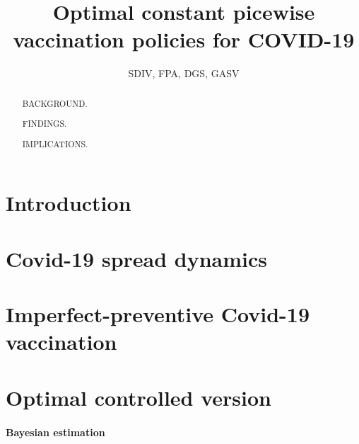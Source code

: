 \documentclass[a4paper,10pt, 5p]{elsarticle}
\begin{document}
    \author{SDIV, FPA, DGS, GASV}
    \title{Optimal constant picewise vaccination policies for COVID-19}
    \begin{abstract}
      
      BACKGROUND.

      FINDINGS.
      
      IMPLICATIONS.
    \end{abstract}
    \maketitle
    \section{Introduction}
      
    \section{Covid-19 spread dynamics}
      
    \section{Imperfect-preventive Covid-19 vaccination}
      
    \section{Optimal controlled version}
       

    \paragraph{Bayesian estimation}
%
\end{document}
